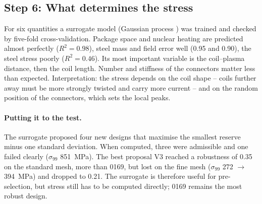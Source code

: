 
\subsection*{Step 6: What determines the stress}
For six quantities a surrogate model (Gaussian process \cite{rasmussen2006}) was trained and checked by five-fold
cross-validation. Package space and nuclear heating are predicted almost perfectly ($R^2=0.98$), steel mass and field
error well (0.95 and 0.90), the steel stress poorly ($R^2=0.46$). Its most important variable is the coil--plasma
distance, then the coil length. Number and stiffness of the connectors matter less than expected. Interpretation: the
stress depends on the coil shape -- coils further away must be more strongly twisted and carry more current -- and on
the random position of the connectors, which sets the local peaks.

\paragraph{Putting it to the test.} The surrogate proposed four new designs that maximise the smallest reserve minus
one standard deviation. When computed, three were admissible and one failed clearly ($\sigma_{99}$ \SI{851}{MPa}).
The best proposal V3 reached a robustness of 0.35 on the standard mesh, more than 0169, but lost on the fine mesh
($\sigma_{99}$ \SI{272}{} $\to$ \SI{394}{MPa}) and dropped to 0.21. The surrogate is therefore useful for
pre-selection, but stress still has to be computed directly; 0169 remains the most robust design.

